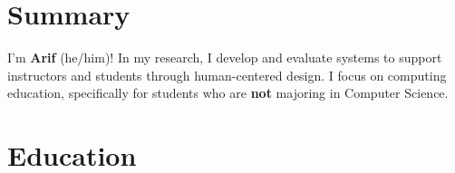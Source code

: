 \documentclass[10pt, letterpaper]{article}
\newenvironment{highlightsforbulletentries}{
    \begin{itemize}[
        topsep=0.10 cm,
        parsep=0.10 cm,
        partopsep=0pt,
        itemsep=0pt,
        leftmargin=10pt
    ]
}{
    \end{itemize}
} %
\newenvironment{onecolentry}{
    \begin{adjustwidth}{
        0.2 cm + 0.00001 cm
    }{
        0.2 cm + 0.00001 cm
    }
}{
    \end{adjustwidth}
} %
\let\hrefWithoutArrow\href
\renewcommand{\href}[2]{\hrefWithoutArrow{#1}{\ifthenelse{\equal{#2}{}}{ }{#2 }\raisebox{.15ex}{\footnotesize \faExternalLink*}}}
\begin{document}



    








    \section{Summary}
    I'm \textbf{Arif} (he/him)! In my research, I develop and evaluate systems to support instructors and students through human-centered design. I focus on computing education, specifically for students who are \textbf{not} majoring in Computer Science.


    \section{Education}
\end{document}
